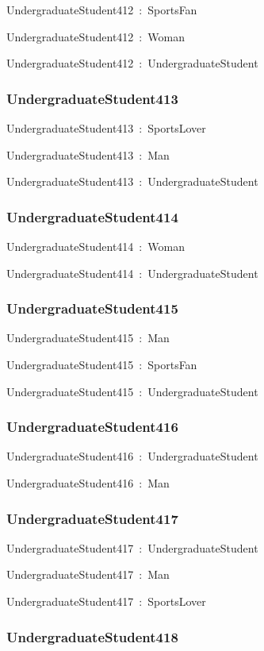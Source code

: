 \documentclass{article}
\begin{document}
UndergraduateStudent412~:~SportsFan

UndergraduateStudent412~:~Woman

UndergraduateStudent412~:~UndergraduateStudent

\subsubsection*{UndergraduateStudent413}

UndergraduateStudent413~:~SportsLover

UndergraduateStudent413~:~Man

UndergraduateStudent413~:~UndergraduateStudent

\subsubsection*{UndergraduateStudent414}

UndergraduateStudent414~:~Woman

UndergraduateStudent414~:~UndergraduateStudent

\subsubsection*{UndergraduateStudent415}

UndergraduateStudent415~:~Man

UndergraduateStudent415~:~SportsFan

UndergraduateStudent415~:~UndergraduateStudent

\subsubsection*{UndergraduateStudent416}

UndergraduateStudent416~:~UndergraduateStudent

UndergraduateStudent416~:~Man

\subsubsection*{UndergraduateStudent417}

UndergraduateStudent417~:~UndergraduateStudent

UndergraduateStudent417~:~Man

UndergraduateStudent417~:~SportsLover

\subsubsection*{UndergraduateStudent418}
\end{document}
